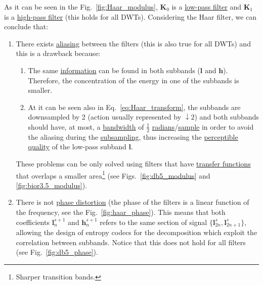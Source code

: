 As it can be seen in the Fig.~\ref{fig:Haar_modulus}, ${\mathbf K}_0$ is a
\href{https://en.wikipedia.org/wiki/Low-pass_filter}{low-pass filter}
and ${\mathbf K}_1$ is a
\href{https://en.wikipedia.org/wiki/High-pass_filter}{high-pass
  filter} (this holds for all DWTs). Considering the Haar filter, we
can conclude that:
\begin{enumerate}
\item There exists
  \href{https://en.wikipedia.org/wiki/Aliasing}{aliasing} between the
  filters (this is also true for all DWTs) and this is a drawback
  because: \begin{enumerate} \item The same
    \href{https://en.wikipedia.org/wiki/Information}{information} can
    be found in both subbands (${\mathbf l}$ and ${\mathbf
      h}$). Therefore, the concentration of the energy in one of the
    subbands is smaller.  \item At it can be seen also in
    Eq.~\ref{eq:Haar_transform}, the subbands are downsampled by 2
    (action usually represented by $\downarrow 2$) and both subbands
    should have, at most, a
    \href{https://en.wikipedia.org/wiki/Bandwidth_(signal_processing)}{bandwidth}
    of $\frac{1}{2}$
    \href{https://en.wikipedia.org/wiki/Radian}{radians}/\href{https://en.wikipedia.org/wiki/Sampling_(signal_processing)}{sample}
    in order to avoid the aliasing during the
    \href{https://en.wikipedia.org/wiki/Downsampling_(signal_processing)}{subsampling},
    thus increasing the
    \href{https://en.wikipedia.org/wiki/Perception}{perceptible}
    \href{https://en.wikipedia.org/wiki/Signal-to-noise_ratio}{quality}
    of the low-pass subband ${\mathbf l}$.  \end{enumerate} These
  problems can be only solved using filters that have
  \href{https://en.wikipedia.org/wiki/Transfer_function}{transfer
    functions} that overlaps a smaller area\footnote{Sharper
  transition bands.} (see Figs.~\ref{fig:db5_modulus} and
  \ref{fig:bior3.5_modulus}).
\item There is not
  \href{https://en.wikipedia.org/wiki/Linear_phase}{phase distortion}
  (the phase of the filters is a linear function of the frequency, see
  the Fig.~\ref{fig:haar_phase}). This means that both coefficients
  ${\mathbf l}^{s+1}_n$ and ${\mathbf h}^{s+1}_n$ refers to the same section of signal
  $\{{\mathbf l}^s_{2n}, {\mathbf l}^s_{2n+1}\}$, allowing the design of entropy codecs
  for the decomposition which exploit the correlation between
  subbands. Notice that this does not hold for all filters (see
  Fig.~\ref{fig:db5_phase}).
\end{enumerate}

